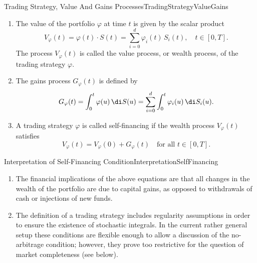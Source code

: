 \begin{defn}{Trading Strategy, Value And Gains Processes}{TradingStrategyValueGains}
	\begin{enumerate}[label=(\roman*)]
		\item The value of the portfolio $\varphi$ at time $t$ is given by the scalar product
		      \begin{equation}\label{eq:ValueOfPortfolio}
			      V_{\varphi}(t) = \varphi(t) \cdot S(t) = \sum_{i=0}^{d} \varphi_i(t)\,S_i(t), \quad t \in [0,T].
		      \end{equation}
		      The process $V_{\varphi}(t)$ is called the value process, or wealth process, of the trading strategy $\varphi$.
		\item The gains process $G_{\varphi}(t)$ is defined by
		      \begin{equation}\label{eq:GainsProcess}
			      G_{\varphi}(t) = \int_{0}^{t} \varphi(u)\,\di S(u) = \sum_{i=0}^{d} \int_{0}^{t} \varphi_i(u)\,\di S_i(u).
		      \end{equation}
		\item A trading strategy $\varphi$ is called self-financing if the wealth process $V_{\varphi}(t)$ satisfies
		      \begin{equation}\label{eq:SelfFinancingCondition}
			      V_{\varphi}(t) = V_{\varphi}(0) + G_{\varphi}(t) \quad \text{for all } t \in [0,T].
		      \end{equation}
	\end{enumerate}
\end{defn}

\begin{xtip}{Interpretation of Self-Financing Condition}{InterpretationSelfFinancing}
	\begin{enumerate}[label=(\roman*)]
		\item The financial implications of the above equations are that all changes in the wealth of the portfolio are due to capital gains, as opposed to withdrawals of cash or injections of new funds.
		\item The definition of a trading strategy includes regularity assumptions in order to ensure the existence of stochastic integrals. In the current rather general setup these conditions are flexible enough to allow a discussion of the no-arbitrage condition; however, they prove too restrictive for the question of market completeness (see below).
	\end{enumerate}
\end{xtip}

